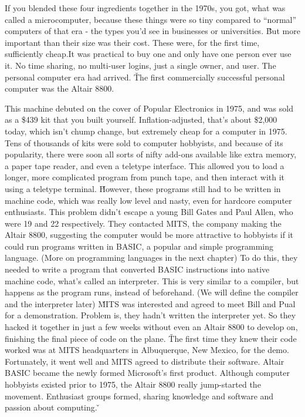 If you blended these four ingredients together in the 1970s, you got, what was called a microcomputer, because these
things were so tiny compared to ``normal'' computers of that era - the types you'd see in businesses or universities.
\v

But more important than their size was their cost. These were, for the first time, sufficiently cheap.It was
practical to buy one and only have one person ever use it. No time sharing, no multi-user logins, just a single
owner, and user. The personal computer era had arrived.  \v

The first commercially successful personal computer was the Altair 8800.


This machine debuted on the cover of Popular Electronics in 1975, and was sold as a \$439 kit that you built yourself.
Inflation-adjusted, that's about \$2,000 today, which isn't chump change, but extremely cheap for a computer in
1975. Tens of thousands of kits were sold to computer hobbyists, and because of its popularity, there were soon all
sorts of nifty add-ons available like extra memory, a paper tape reader, and even a teletype interface. This allowed
you to load a longer, more complicated program from punch tape, and then interact with it using a teletype terminal. \v

However, these programs still had to be written in machine code, which was really low level and nasty, even for
hardcore computer enthusiasts. This problem didn't escape a young Bill Gates and Paul Allen, who were 19 and 22
respectively. They contacted MITS, the company making the Altair 8800, suggesting the computer would be more
attractive to hobbyists if it could run programs written in BASIC, a popular and simple programming language. (More
on programming languages in the next chapter) To do this, they needed to write a program that converted BASIC
instructions into native machine code, what's called an interpreter. This is very similar to a compiler, but happens
as the program runs, instead of beforehand. (We will define the compiler and the interpreter later) \v

MITS was interested and agreed to meet Bill and Pual for a demonstration. Problem is, they hadn't written the
interpreter yet. So they hacked it together in just a few weeks without even an Altair 8800 to develop on, finishing
the final piece of code on the plane. \v

The first time they knew their code worked was at MITS headquarters in Albuquerque, New Mexico, for the demo.
Fortunately, it went well and MITS agreed to distribute their software. Altair BASIC became the newly formed
Microsoft's first product. Although computer hobbyists existed prior to 1975, the Altair 8800 really jump-started the
movement. Enthusiast groups formed, sharing knowledge and software and passion about computing. \v

